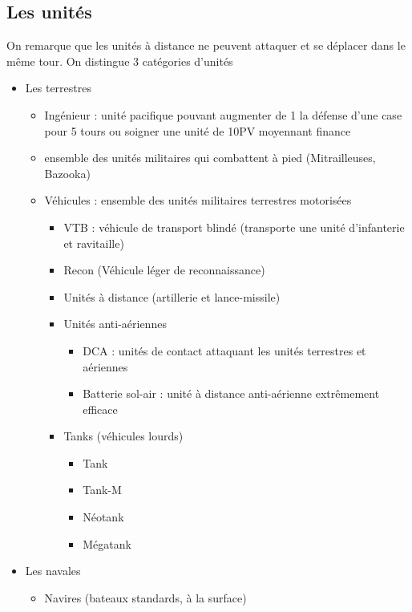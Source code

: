\documentclass[a4paper,10pt]{article} %
\begin{document}
\subsection{Les unités}
On remarque que les unités à distance ne peuvent attaquer et se déplacer dans le même tour. 
On distingue 3 catégories d'unités

\begin{itemize}
\item Les terrestres
\begin{itemize}
    \item Ingénieur : unité pacifique pouvant augmenter de 1 la défense d'une case pour 5 tours ou soigner une unité de 10PV moyennant finance
    \item ensemble des unités militaires qui combattent à pied (Mitrailleuses, Bazooka)
    \item Véhicules : ensemble des unités militaires terrestres motorisées
    \begin{itemize}
        \item VTB : véhicule de transport blindé (transporte une unité d'infanterie et ravitaille)
        \item Recon (Véhicule léger de reconnaissance)
        \item Unités à distance (artillerie et lance-missile)
        \item Unités anti-aériennes
        \begin{itemize}
            \item DCA : unités de contact attaquant les unités terrestres et aériennes
            \item Batterie sol-air : unité à distance anti-aérienne extrêmement efficace
        \end{itemize}
        \item Tanks (véhicules lourds)
        \begin{itemize}
            \item Tank
            \item Tank-M
            \item Néotank
            \item Mégatank
        \end{itemize}
    \end{itemize}
\end{itemize}
\item Les navales
\begin{itemize}
    \item Navires (bateaux standards, à la surface)

\end{itemize}
\end{itemize}
\end{document}
